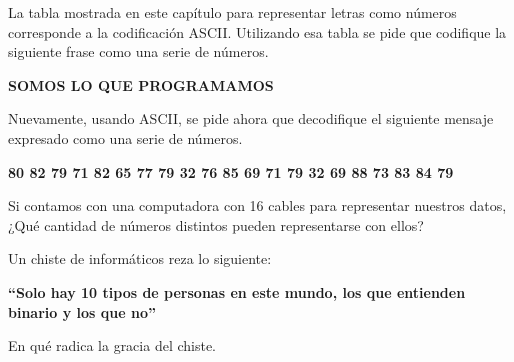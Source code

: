 \begin{exercise}
La tabla mostrada en este capítulo para representar letras como números
corresponde a la codificación ASCII. Utilizando esa tabla se pide que codifique
la siguiente frase como una serie de números.

\textbf{SOMOS LO QUE PROGRAMAMOS}
\end{exercise}

\begin{exercise}
Nuevamente, usando ASCII, se pide ahora que decodifique el siguiente mensaje
expresado como una serie de números.

\textbf{80 82 79 71 82 65 77 79 32 76 85 69 71 79 32 69 88 73 83 84 79}
\end{exercise}

\begin{exercise}
Si contamos con una computadora con 16 cables para representar nuestros datos,
¿Qué cantidad de números distintos pueden representarse con ellos?
\end{exercise}

\begin{exercise}
Un chiste de informáticos reza lo siguiente:

\textbf{``Solo hay 10 tipos de personas en este mundo, los que entienden binario
y los que no''}

En qué radica la gracia del chiste.
\end{exercise}

